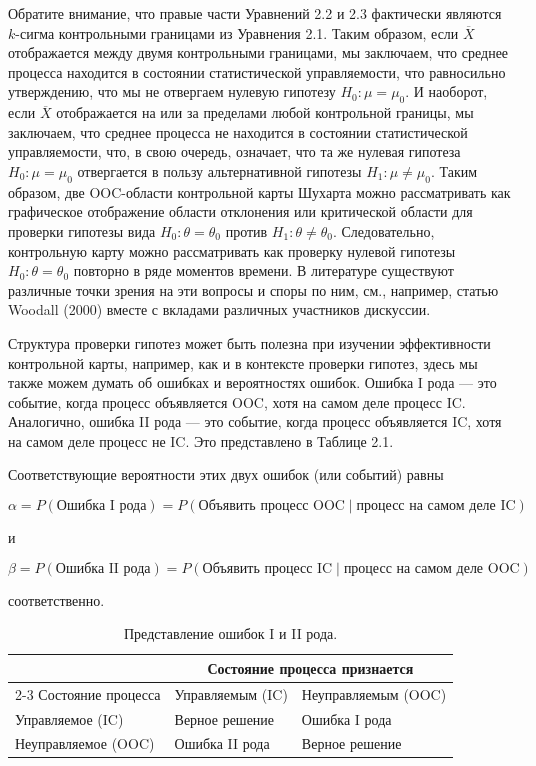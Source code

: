 Обратите внимание, что правые части Уравнений 2.2 и 2.3 фактически являются \(k\)-сигма контрольными границами из Уравнения 2.1. Таким образом, если \(\overline{X}\) отображается между двумя контрольными границами, мы заключаем, что среднее процесса находится в состоянии статистической управляемости, что равносильно утверждению, что мы не отвергаем нулевую гипотезу \(H_0: \mu = \mu_0\). И наоборот, если \(\overline{X}\) отображается на или за пределами любой контрольной границы, мы заключаем, что среднее процесса не находится в состоянии статистической управляемости, что, в свою очередь, означает, что та же нулевая гипотеза \(H_0: \mu = \mu_0\) отвергается в пользу альтернативной гипотезы \(H_1: \mu \neq \mu_0\). Таким образом, две OOC-области контрольной карты Шухарта можно рассматривать как графическое отображение области отклонения или критической области для проверки гипотезы вида \(H_0: \theta = \theta_0\) против \(H_1: \theta \neq \theta_0\). Следовательно, контрольную карту можно рассматривать как проверку нулевой гипотезы \(H_0: \theta = \theta_0\) повторно в ряде моментов времени. В литературе существуют различные точки зрения на эти вопросы и споры по ним, см., например, статью Woodall (2000) вместе с вкладами различных участников дискуссии.

Структура проверки гипотез может быть полезна при изучении эффективности контрольной карты, например, как и в контексте проверки гипотез, здесь мы также можем думать об ошибках и вероятностях ошибок. Ошибка I рода — это событие, когда процесс объявляется OOC, хотя на самом деле процесс IC. Аналогично, ошибка II рода — это событие, когда процесс объявляется IC, хотя на самом деле процесс не IC. Это представлено в Таблице 2.1.

Соответствующие вероятности этих двух ошибок (или событий) равны

\[
\alpha = P(\text{Ошибка I рода}) = P(\text{Объявить процесс OOC} \mid \text{процесс на самом деле IC})
\]

и

\[
\beta = P(\text{Ошибка II рода}) = P(\text{Объявить процесс IC} \mid \text{процесс на самом деле OOC})
\]

соответственно.

\begin{table}[htbp]
	\centering
	\caption{Представление ошибок I и II рода.}
	\label{tab:2.1}
	\begin{tabular}{lll}
		\toprule
		& \multicolumn{2}{c}{Состояние процесса признается} \\
		\cmidrule{2-3}
		Состояние процесса & Управляемым (IC) & Неуправляемым (OOC) \\
		\midrule
		Управляемое (IC) & Верное решение & Ошибка I рода \\
		Неуправляемое (OOC) & Ошибка II рода & Верное решение \\
		\bottomrule
	\end{tabular}
\end{table}

